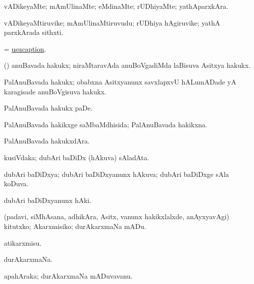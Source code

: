 \bentry
{} 
\gl{\kirxvi}
\expl{}
\bmng
vADikeyaMte; mAmUlinaMte; eMdinaMte; rUDhiyaMte; yathAparxkAra. 
\emng
\eentry

\bentry
{} 
\gl{\nA}
\expl{}
\bmng
vADikeyaMtiruvike; mAmUlinaMtiruvudu; rUDhiya hAgiruvike; yathA parxkArada sithxti. 
\emng
\eentry

\bentry
{} 
\gl{\nA}
\expl{}
\bmng
= \hyperlink{usucaption}{usucaption}. 
\emng
\eentry

\bentry
{} 
\gl{\nA}
\expl{}
\bmng
(\nAyxshA) anuBavada hakukx; niraMtaravAda anuBoVgadiMda laBisuva Asitxya hakukx. 
\emng
\eentry

\bentry
{} 
\gl{\nA}
\expl{}
\bmng
PalAnuBavada hakukx; obabxna Asitxyanunx savxlapxvU hALumADade yA karagisade anuBoVgisuva hakukx. 
\emng
\eentry

\bentry
{} 
\gl{\sakirx}
\expl{}
\bmng
PalAnuBavada hakukx paDe. 
\emng
\eentry

\bentry
{} 
\gl{\gu}
\expl{}
\bmng
PalAnuBavada hakikxge saMbaMdhisida; PalAnuBavada hakikxna. 
\emng
\eentry

\bentry
{} 
\gl{\nA}
\expl{}
\bmng
PalAnuBavada hakukxdAra. 
\emng
\eentry

\bentry
{} 
\gl{\nA}
\expl{}
\bmng
kusiVdaka; dubAri baDiDx (hAkuva) sAladAta. 
\emng
\eentry

\bentry
{} 
\gl{\gu}
\expl{}
\bmng
dubAri baDiDxya; dubAri baDiDxyanunx hAkuva; dubAri baDiDxge sAla koDuva. 
\emng
\eentry

\bentry
{} 
\gl{\kirxvi}
\expl{}
\bmng
dubAri baDiDxyanunx hAki. 
\emng
\eentry

\bentry
{} 
\gl{\akirx}
\expl{}
\bmng
(padavi, siMhAsana, adhikAra, Asitx, \mo vanunx hakikxlalxde, anAyxyavAgi) kitutxko; Akarxmisiko; durAkarxmaNa mADu. 
\emng

\noindent 
\gl{\akirx}
\expl{}
\bmng
atikarxmisu. 
\emng
\eentry

\bentry
{} 
\gl{\nA}
\expl{}
\bmng
durAkarxmaNa. 
\emng
\eentry

\bentry
{} 
\gl{\nA}
\expl{}
\bmng
apahAraka; durAkarxmaNa mADuvavanu. 
\emng
\eentry

